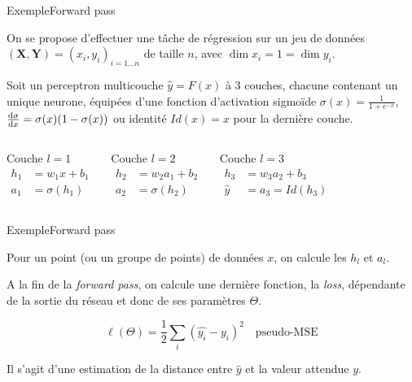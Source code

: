 \documentclass[12pt,dvipsnames,aspectratio=169]{beamer}
\newcommand{\X}[0]{\mathbf{X}}
\newcommand{\Y}[0]{\mathbf{Y}}
\begin{document}
\begin{frame}{Exemple}{Forward pass}

    On se propose d'effectuer une tâche de régression sur un jeu de données $(\X, \Y) = (x_i, y_i)_{i=1\dots n}$ de taille $n$, avec $\dim x_i = 1 = \dim y_i$.

    Soit un perceptron multicouche $\hat{y} = F(x)$ à 3 couches, chacune contenant un unique neurone, équipées d'une fonction d'activation sigmoïde $\sigma(x) = \frac{1}{1 + e^{-x}}$, $\odv{\sigma}{x} = \sigma(x)(1-\sigma(x))$ ou identité $Id(x) = x$ pour la dernière couche.

    \begin{columns}
     \begin{center}
        Couche $l=1$
         \begin{align*}
            h_1 &= w_1 x + b_1 \\
            a_1 &= \sigma(h_1)
        \end{align*}
     \end{center}
     \begin{center}
      Couche $l=2$
     \begin{align*}
        h_2 &= w_2 a_1 + b_2 \\
        a_2 &= \sigma(h_2)
     \end{align*}
     \end{center}
     \begin{center}
      Couche $l=3$
     \begin{align*}
        h_3 &= w_3 a_2 + b_3 \\
        \hat{y} &= a_3 = Id(h_3)
     \end{align*}
     \end{center}
 \end{columns}

\end{frame}


\begin{frame}{Exemple}{Forward pass}

    Pour un point (ou un groupe de points) de données $x$, on calcule les $h_l$ et $a_l$.\par
    A la fin de la \textit{forward pass}, on calcule une dernière fonction, la \textit{loss}, dépendante de la sortie du réseau et donc de ses paramètres $\Theta$.
    
    \begin{equation*}
        \ell(\Theta) = \frac{1}{2} \sum_i (\hat{y_i} - y_i)^2 \quad \text{pseudo-MSE}
    \end{equation*}

    Il s'agit d'une estimation de la distance entre $\hat{y}$ et la valeur attendue $y$.
    
\end{frame}
\end{document}
